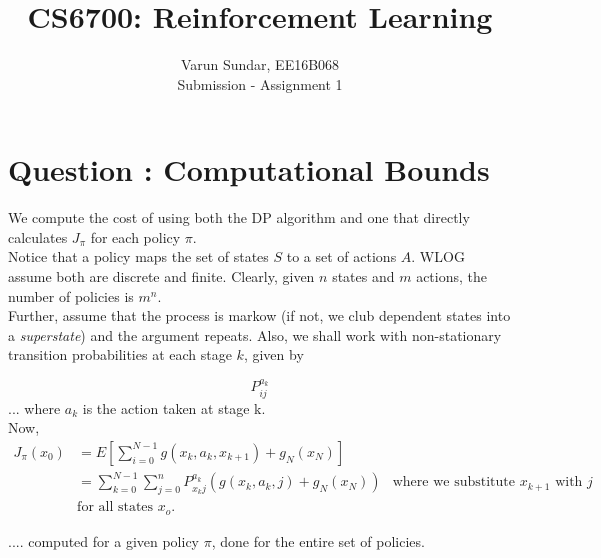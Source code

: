 \documentclass[12pt]{article}
\begin{document}
 
 
 
\title{CS6700: Reinforcement Learning}%
\author{Varun Sundar, EE16B068\\ %
 Submission - Assignment 1} %
 
\maketitle
 
\section{Question : Computational Bounds}

We compute the cost of using both the DP algorithm and one that directly calculates $J_{\pi}$ for each policy $\pi$. \\

Notice that a policy maps the set of states $S$ to a set of actions $A$. WLOG assume both are discrete and finite. Clearly, given $n$ states and $m$ actions, the number of policies is $m^n$.\\

Further, assume that the process is markow  (if not, we club dependent states into a \textit{superstate}) and the argument repeats. Also, we shall work with non-stationary transition probabilities at each stage $k$, given by

$$P_{ij}^{a_k}$$
\quad \quad \quad \quad ...  where $a_k$ is the action taken at stage k. \\

Now, \\

\begin{align*}
 J_{\pi}(x_0)  & = E[\sum_{i=0}^{N-1}g(x_k,a_k,x_{k+1}) + g_N(x_N)]  \\ 
& = \sum_{k=0}^{N-1} \sum_{j=0}^{n} P_{x_k j}^{a_k} (g(x_k,a_k,j) + g_N(x_N)) & \text{where we substitute $x_{k+1}$ with $j$ } \\
& \text{for all states }  x_o .
\end{align*}



\quad \quad \quad \quad  .... computed for a given policy $\pi$, done for the entire set of policies. \\
\end{document}
